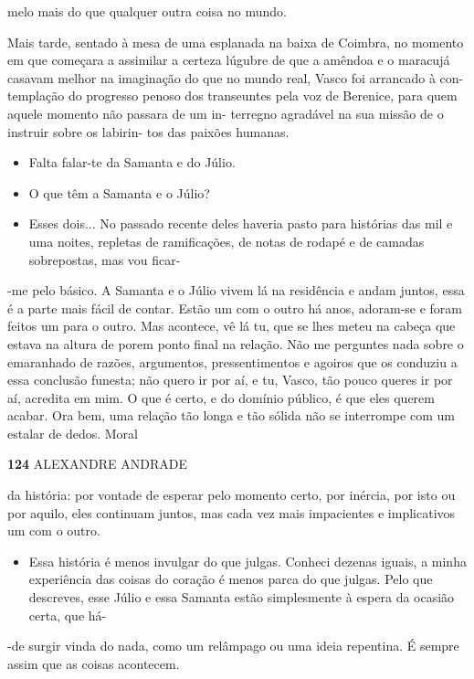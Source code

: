 melo mais do que qualquer outra coisa no mundo.

Mais tarde, sentado à mesa de uma esplanada na baixa de Coimbra, no
momento em que começara a assimilar a certeza lúgubre de que a amêndoa e
o maracujá casavam melhor na imaginação do que no mundo real, Vasco foi
arrancado à con- templação do progresso penoso dos transeuntes pela voz
de Berenice, para quem aquele momento não passara de um in- terregno
agradável na sua missão de o instruir sobre os labirin- tos das paixões
humanas.

\begin{itemize}
\tightlist
\item
  Falta falar-te da Samanta e do Júlio.
\item
  O que têm a Samanta e o Júlio?
\item
  Esses dois... No passado recente deles haveria pasto para histórias
  das mil e uma noites, repletas de ramificações, de notas de rodapé e
  de camadas sobrepostas, mas vou ficar-
\end{itemize}

-me pelo básico. A Samanta e o Júlio vivem lá na residência e andam
juntos, essa é a parte mais fácil de contar. Estão um com o outro há
anos, adoram-se e foram feitos um para o outro. Mas acontece, vê lá tu,
que se lhes meteu na cabeça que estava na altura de porem ponto final na
relação. Não me perguntes nada sobre o emaranhado de razões, argumentos,
pressentimentos e agoiros que os conduziu a essa conclusão funesta; não
quero ir por aí, e tu, Vasco, tão pouco queres ir por aí, acredita em
mim. O que é certo, e do domínio público, é que eles querem acabar. Ora
bem, uma relação tão longa e tão sólida não se interrompe com um estalar
de dedos. Moral

\textbf{124 }ALEXANDRE ANDRADE

da história: por vontade de esperar pelo momento certo, por inércia, por
isto ou por aquilo, eles continuam juntos, mas cada vez mais impacientes
e implicativos um com o outro.

\begin{itemize}
\tightlist
\item
  Essa história é menos invulgar do que julgas. Conheci dezenas iguais,
  a minha experiência das coisas do coração é menos parca do que julgas.
  Pelo que descreves, esse Júlio e essa Samanta estão simplesmente à
  espera da ocasião certa, que há-
\end{itemize}

-de surgir vinda do nada, como um relâmpago ou uma ideia repentina. É
sempre assim que as coisas acontecem.

